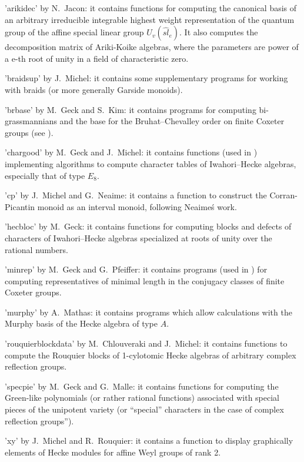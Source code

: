 'arikidec'  by N.~Jacon: it contains  functions for computing the canonical
basis  of an arbitrary irreducible integrable highest weight representation
of   the  quantum   group  of   the  affine   special  linear   group  $U_v
(\widehat{sl}_e)$. It also computes the decomposition matrix of Ariki-Koike
algebras, where the parameters are power of a e-th root of unity in a field
of characteristic zero.

'braidsup'  by  J.~Michel:  it  contains  some  supplementary  programs for
working with braids (or more generally Garside monoids).

'brbase'  by  M.~Geck  and  S.~Kim:  it  contains  programs  for  computing
bi-grassmannians  and the  base for  the Bruhat--Chevalley  order on finite
Coxeter groups (see \cite{GK96}).

'chargood'  by  M.~Geck  and  J.~Michel:  it  contains  functions  (used in
\cite{GM97})   implementing  algorithms  to  compute  character  tables  of
Iwahori--Hecke algebras, especially that of type $E_8$.

'cp'  by J.~Michel and  G.~Neaime: it contains  a function to construct the
Corran-Picantin monoid as an interval monoid, following Neaime\'s work.

'hecbloc'  by  M.~Geck:  it  contains  functions  for  computing blocks and
defects  of characters of  Iwahori--Hecke algebras specialized  at roots of
unity over the rational numbers.

'minrep'  by  M.~Geck  and  G.~Pfeiffer:  it  contains  programs  (used  in
\cite{GP93})  for  computing  representatives  of  minimal  length  in  the
conjugacy classes of finite Coxeter groups.

'murphy'  by A.~Mathas: it contains  programs which allow calculations with
the Murphy basis of the Hecke algebra of type $A$.

'rouquierblockdata'  by M.~Chlouveraki and J.~Michel: it contains functions
to  compute the Rouquier blocks of  1-cylotomic Hecke algebras of arbitrary
complex reflection groups.

'specpie'  by M.~Geck and G.~Malle: it contains functions for computing the
Green-like  polynomials  (or  rather  rational  functions)  associated with
special  pieces of the unipotent variety  (or ``special'' characters in the
case of complex reflection groups'').

'xy'  by  J.~Michel  and  R.~Rouquier:  it  contains  a function to display
graphically elements of Hecke modules for affine Weyl groups of rank 2.

